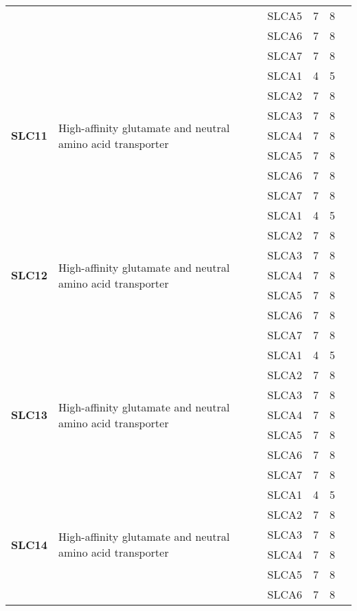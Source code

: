 \documentclass[12pt]{report}
\begin{document}
\begin{center}
\begin{longtable}{|p{1.5cm}|p{3.2cm}|p{1.9cm}|p{1.65cm}|p{3cm}|p{3cm}|}
\cline{3-6}
&&SLCA5&7 & 8&\\ 
\cline{3-6}
&&SLCA6&7 & 8&\\ 
\cline{3-6}
&&SLCA7&7 & 8&\\ 
\hline
\multirow{7}{1.5cm}{\textbf{SLC11}} & \multirow{7}{4cm}{High-affinity glutamate and neutral amino acid transporter} & SLCA1 & 4 & 5\\ 
\cline{3-6}
&&SLCA2&7 & 8&\\ 
\cline{3-6}
&&SLCA3&7 & 8&\\ 
\cline{3-6}
&&SLCA4&7 & 8&\\ 
\cline{3-6}
&&SLCA5&7 & 8&\\ 
\cline{3-6}
&&SLCA6&7 & 8&\\ 
\cline{3-6}
&&SLCA7&7 & 8&\\ 
\hline
\multirow{7}{1.5cm}{\textbf{SLC12}} & \multirow{7}{4cm}{High-affinity glutamate and neutral amino acid transporter} & SLCA1 & 4 & 5\\ 
\cline{3-6}
&&SLCA2&7 & 8&\\ 
\cline{3-6}
&&SLCA3&7 & 8&\\ 
\cline{3-6}
&&SLCA4&7 & 8&\\ 
\cline{3-6}
&&SLCA5&7 & 8&\\ 
\cline{3-6}
&&SLCA6&7 & 8&\\ 
\cline{3-6}
&&SLCA7&7 & 8&\\ 
\hline
\multirow{7}{1.5cm}{\textbf{SLC13}} & \multirow{7}{4cm}{High-affinity glutamate and neutral amino acid transporter} & SLCA1 & 4 & 5\\ 
\cline{3-6}
&&SLCA2&7 & 8&\\ 
\cline{3-6}
&&SLCA3&7 & 8&\\ 
\cline{3-6}
&&SLCA4&7 & 8&\\ 
\cline{3-6}
&&SLCA5&7 & 8&\\ 
\cline{3-6}
&&SLCA6&7 & 8&\\ 
\cline{3-6}
&&SLCA7&7 & 8&\\ 
\hline
\multirow{7}{1.5cm}{\textbf{SLC14}} & \multirow{7}{4cm}{High-affinity glutamate and neutral amino acid transporter} & SLCA1 & 4 & 5\\ 
\cline{3-6}
&&SLCA2&7 & 8&\\ 
\cline{3-6}
&&SLCA3&7 & 8&\\ 
\cline{3-6}
&&SLCA4&7 & 8&\\ 
\cline{3-6}
&&SLCA5&7 & 8&\\ 
\cline{3-6}
&&SLCA6&7 & 8&\\ 

\end{longtable}
\end{center}
\end{document}
